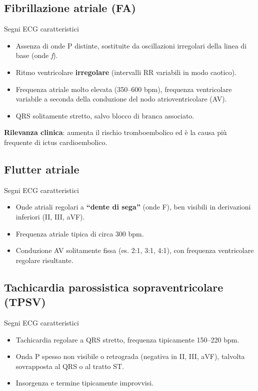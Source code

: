 \documentclass[11pt,a4paper]{article}
\begin{document}
\subsection{Fibrillazione atriale (FA)}
\begin{keybox}{Segni ECG caratteristici}
\begin{itemize}[leftmargin=1.2em]
  \item Assenza di onde P distinte, sostituite da oscillazioni irregolari della linea di base (onde \textit{f}).
  \item Ritmo ventricolare \textbf{irregolare} (intervalli RR variabili in modo caotico).
  \item Frequenza atriale molto elevata (350--600 bpm), frequenza ventricolare variabile a seconda della conduzione del nodo atrioventricolare (AV).
  \item QRS solitamente stretto, salvo blocco di branca associato.
\end{itemize}
\end{keybox}
\textbf{Rilevanza clinica}: aumenta il rischio tromboembolico ed è la causa più frequente di ictus cardioembolico.

\subsection{Flutter atriale}
\begin{keybox}{Segni ECG caratteristici}
\begin{itemize}[leftmargin=1.2em]
  \item Onde atriali regolari a \textbf{“dente di sega”} (onde F), ben visibili in derivazioni inferiori (II, III, aVF).
  \item Frequenza atriale tipica di circa 300 bpm.
  \item Conduzione AV solitamente fissa (es. 2:1, 3:1, 4:1), con frequenza ventricolare regolare risultante.
\end{itemize}
\end{keybox}

\subsection{Tachicardia parossistica sopraventricolare (TPSV)}
\begin{keybox}{Segni ECG caratteristici}
\begin{itemize}[leftmargin=1.2em]
  \item Tachicardia regolare a QRS stretto, frequenza tipicamente 150--220 bpm.
  \item Onda P spesso non visibile o retrograda (negativa in II, III, aVF), talvolta sovrapposta al QRS o al tratto ST.
  \item Insorgenza e termine tipicamente improvvisi.
\end{itemize}
\end{keybox}
\end{document}

